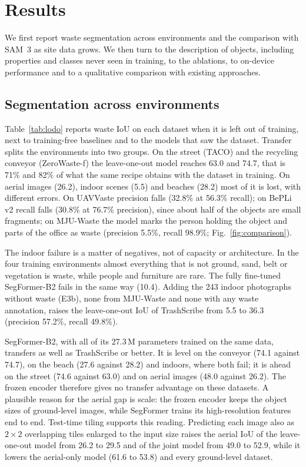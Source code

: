 \documentclass[pdflatex,sn-basic,Numbered]{sn-jnl}%
\newcommand{\trashscribe}{TrashScribe}
\begin{document}
\section{Results}\label{sec:results}

We first report waste segmentation across environments and the comparison with SAM~3 as site data grows. We then turn to the description of objects, including properties and classes never seen in training, to the ablations, to on-device performance and to a qualitative comparison with existing approaches.

\subsection{Segmentation across environments}\label{sec:lodo}
Table~\ref{tab:lodo} reports waste IoU on each dataset when it is left out of training, next to training-free baselines and to the models that saw the dataset. Transfer splits the environments into two groups. On the street (TACO) and the recycling conveyor (ZeroWaste-f) the leave-one-out model reaches 63.0 and 74.7, that is 71\% and 82\% of what the same recipe obtains with the dataset in training. On aerial images (26.2), indoor scenes (5.5) and beaches (28.2) most of it is lost, with different errors. On UAVVaste precision falls (32.8\% at 56.3\% recall); on BePLi v2 recall falls (30.8\% at 76.7\% precision), since about half of the objects are small fragments; on MJU-Waste the model marks the person holding the object and parts of the office as waste (precision 5.5\%, recall 98.9\%; Fig.~\ref{fig:comparison}).

The indoor failure is a matter of negatives, not of capacity or architecture. In the four training environments almost everything that is not ground, sand, belt or vegetation is waste, while people and furniture are rare. The fully fine-tuned SegFormer-B2 fails in the same way (10.4). Adding the 243 indoor photographs without waste (E3b), none from MJU-Waste and none with any waste annotation, raises the leave-one-out IoU of \trashscribe{} from 5.5 to 36.3 (precision 57.2\%, recall 49.8\%).

SegFormer-B2, with all of its 27.3\,M parameters trained on the same data, transfers as well as \trashscribe{} or better. It is level on the conveyor (74.1 against 74.7), on the beach (27.6 against 28.2) and indoors, where both fail; it is ahead on the street (74.6 against 63.0) and on aerial images (48.0 against 26.2). The frozen encoder therefore gives no transfer advantage on these datasets. A plausible reason for the aerial gap is scale: the frozen encoder keeps the object sizes of ground-level images, while SegFormer trains its high-resolution features end to end. Test-time tiling supports this reading. Predicting each image also as $2\times2$ overlapping tiles enlarged to the input size raises the aerial IoU of the leave-one-out model from 26.2 to 29.5 and of the joint model from 49.0 to 52.9, while it lowers the aerial-only model (61.6 to 53.8) and every ground-level dataset.
\end{document}
